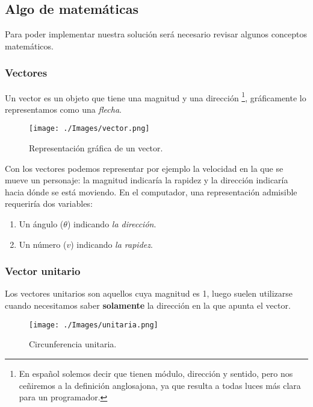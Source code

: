 \newpage
\clearpage

\newpage 
\subsection{Algo de matemáticas}

Para poder implementar nuestra solución será necesario revisar algunos conceptos matemáticos. 

\subsubsection{Vectores}

Un vector es un objeto que tiene una magnitud y una dirección \cite{introVectors} \footnote{En español solemos decir que tienen módulo, dirección y sentido, pero nos ceñiremos a la definición anglosajona, ya que resulta a todas luces más clara para un programador.}, gráficamente lo representamos como una \emph{flecha}.
 
 \begin{figure}[h!]
 	\centering
 	\texttt{[image: ./Images/vector.png]}
 	\caption{Representación gráfica de un vector.}
 	\label{vector}
 \end{figure}

Con los vectores podemos representar por ejemplo la velocidad en la que se mueve un personaje: la magnitud indicaría la rapidez y la dirección indicaría hacia dónde se está moviendo. En el computador, una representación admisible requeriría dos variables:

\begin{enumerate}
\item Un ángulo ($\theta$) indicando \emph{la dirección}.

\item Un número ($v$) indicando \emph{la rapidez}.
\end{enumerate}


\subsubsection{Vector unitario}

Los vectores unitarios son aquellos cuya magnitud es 1, luego suelen utilizarse cuando necesitamos saber \textbf{solamente} la dirección en la que apunta el vector.

\begin{figure}[h!]
	\centering
	\texttt{[image: ./Images/unitaria.png]}
	\caption{Circunferencia unitaria.}
	\label{unitaria}
\end{figure}


